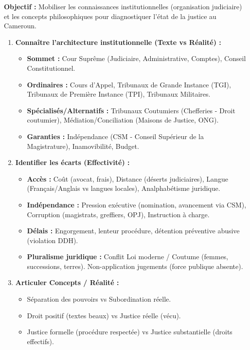 \documentclass[11pt]{article}
\newcommand{\cle}[1]{{\popxbold\color{popdark}#1}}
\begin{document}
\begin{methode}
    \textbf{Objectif :} Mobiliser les connaissances institutionnelles (organisation judiciaire) et les concepts philosophiques pour diagnostiquer l'état de la justice au Cameroun.
    \begin{enumerate}
        \item \textbf{Connaître l'architecture institutionnelle (Texte vs Réalité) :}
            \begin{itemize}
                \item \textbf{Sommet :} Cour Suprême (Judiciaire, Administrative, Comptes), Conseil Constitutionnel.
                \item \textbf{Ordinaires :} Cours d'Appel, Tribunaux de Grande Instance (TGI), Tribunaux de Première Instance (TPI), Tribunaux Militaires.
                \item \textbf{Spécialisés/Alternatifs :} Tribunaux Coutumiers (Chefferies - Droit coutumier), Médiation/Conciliation (Maisons de Justice, ONG).
                \item \textbf{Garanties :} Indépendance (CSM - Conseil Supérieur de la Magistrature), Inamovibilité, Budget.
            \end{itemize}
        \item \textbf{Identifier les écarts (Effectivité) :} 
            \begin{itemize}
                \item \textbf{Accès :} Coût (avocat, frais), Distance (déserts judiciaires), Langue (Français/Anglais vs langues locales), Analphabétisme juridique.
                \item \textbf{Indépendance :} Pression exécutive (nomination, avancement via CSM), Corruption (magistrats, greffiers, OPJ), Instruction à charge.
                \item \textbf{Délais :} Engorgement, lenteur procédure, détention préventive abusive (violation DDH).
                \item \textbf{Pluralisme juridique :} Conflit Loi moderne / Coutume (femmes, successions, terres). Non-application jugements (force publique absente).
            \end{itemize}
        \item \textbf{Articuler Concepts / Réalité :} 
            \begin{itemize}
                \item \cle{Séparation des pouvoirs} vs \cle{Subordination} réelle.
                \item \cle{Droit positif} (textes beaux) vs \cle{Justice réelle} (vécu).
                \item \cle{Justice formelle} (procédure respectée) vs \cle{Justice substantielle} (droits effectifs).
            \end{itemize}
    \end{enumerate}
\end{methode}
\end{document}
